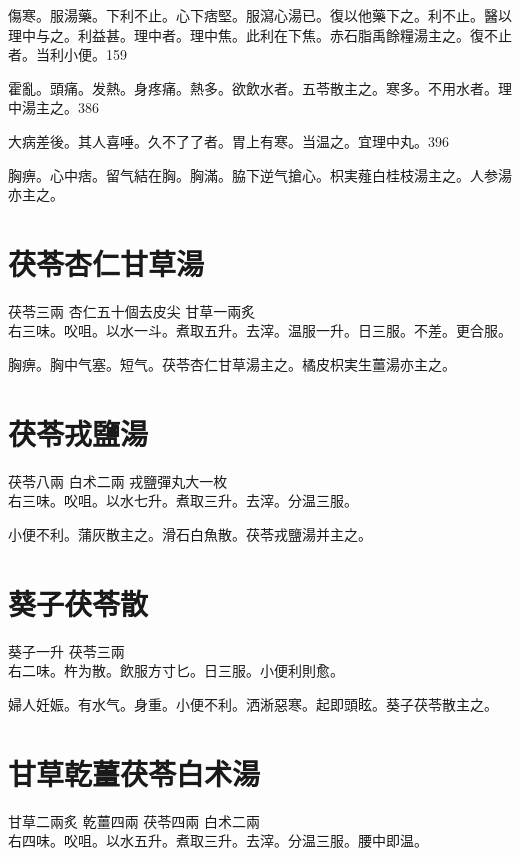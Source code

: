 傷寒。服湯藥。下利不止。心下痞堅。服瀉心湯已。復以他藥下之。利不止。醫以理中与之。利益甚。理中者。理中焦。此利在下焦。赤石脂禹餘糧湯主之。復不止者。当利小便。159

霍亂。頭痛。发熱。身疼痛。熱多。欲飲水者。五苓散主之。寒多。不用水者。理中湯主之。386

大病差後。其人喜唾。久不了了者。胃上有寒。当温之。宜理中丸。396

胸痹。心中痞。留气結在胸。胸滿。脇下逆{\khaaitp 气}搶心。枳実薤白桂枝湯主之。人参湯亦主之。

\section{茯苓杏仁甘草湯}

茯苓{\scriptsize 三兩} 杏仁{\scriptsize 五十個去皮尖} 甘草{\scriptsize 一兩炙}\\
右三味。㕮咀。以水一斗。煮取五升。去滓。温服一升。日三服。不差。更合服。

胸痹。胸中气塞。短气。茯苓杏仁甘草湯主之。橘{\khaaitp 皮}枳{\khaaitp 実生}薑湯亦主之。

\section{茯苓戎鹽湯}

茯苓{\scriptsize 八兩} 白术{\scriptsize 二兩} 戎鹽{\scriptsize 彈丸大一枚}\\
右三味。㕮咀。以水七升。煮取三升。去滓。分温三服。

小便不利。蒲灰散主之。滑石白魚散。茯苓戎鹽湯并主之。

\section{葵子茯苓散}

葵子{\scriptsize 一升} 茯苓{\scriptsize 三兩}\\
右二味。杵为散。飲服方寸匕。日三服。小便利則愈。

{\khaaitp 婦人}妊娠。有水气。身重。小便不利。洒淅惡寒。起即頭眩。葵子茯苓散主之。

\section{甘草乾薑茯苓白术湯}

甘草{\scriptsize 二兩炙} 乾薑{\scriptsize 四兩} 茯苓{\scriptsize 四兩} 白术{\scriptsize 二兩}\\
右四味。㕮咀。以水五升。煮取三升。去滓。分温三服。腰中即温。

